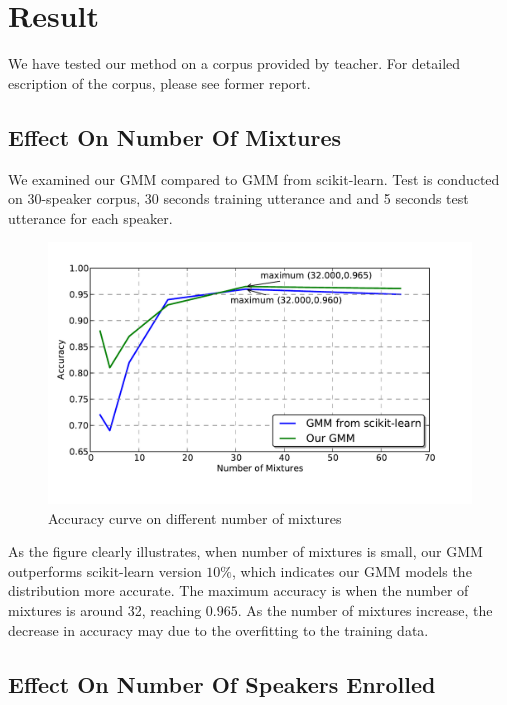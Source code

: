 \section{Result}
We have tested our method on a corpus provided by teacher. For detailed
escription of the corpus, please see former report.

\subsection{Effect On Number Of Mixtures}
We examined our GMM compared to GMM from scikit-learn.
Test is conducted on 30-speaker corpus, 30 seconds training utterance
and and 5 seconds test utterance for each speaker.

\begin{figure}[!ht]
	\centering
	\includegraphics[width=\linewidth]{res/mixture-both.pdf}
	\caption{Accuracy curve on different number of mixtures}
\end{figure}

As the figure clearly illustrates, when number of mixtures is small,
our GMM outperforms scikit-learn version $10\%$, which indicates our
GMM models the distribution more accurate. The maximum accuracy
is when the number of mixtures is around 32, reaching $0.965$. As
the number of mixtures increase, the decrease in accuracy
may due to the overfitting to the training data.

\subsection{Effect On Number Of Speakers Enrolled}

